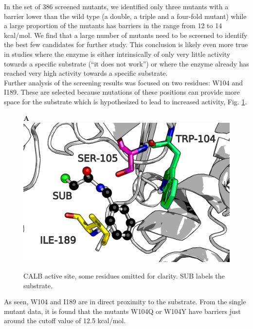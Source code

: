 In the set of 386 screened mutants, we identified only three mutants with a barrier lower than the wild type (a double, a triple and a four-fold mutant) while a large proportion of the mutants has barriers in the range from 12 to 14 kcal/mol.
We find that a large number of mutants need to be screened to identify the best few candidates for further study.
This conclusion is likely even more true in studies where the enzyme is either intrinsically of only very little activity towards a specific substrate (``it does not work'') or where the enzyme already has reached very high activity towards a specific substrate\cite{agresti2010ultrahigh}.\\
Further analysis of the screening results was focused on two residues: W104 and I189.
These are selected because mutations of these positions can provide more space for the substrate which is hypothesized to lead to increased activity, Fig. \ref{fig:calb-views}.
\begin{figure}[htbp] 
\textbf{A}
\includegraphics[width=0.95\linewidth]{calb-active-site.png}
\caption{
CALB active site, some residues omitted for clarity.
SUB labels the substrate.
}
\label{fig:calb-views}
\end{figure}
As seen, W104 and I189 are in direct proximity to the substrate.
From the single mutant data, it is found that the mutants W104Q or W104Y have barriers just around the cutoff value of 12.5 kcal/mol.
